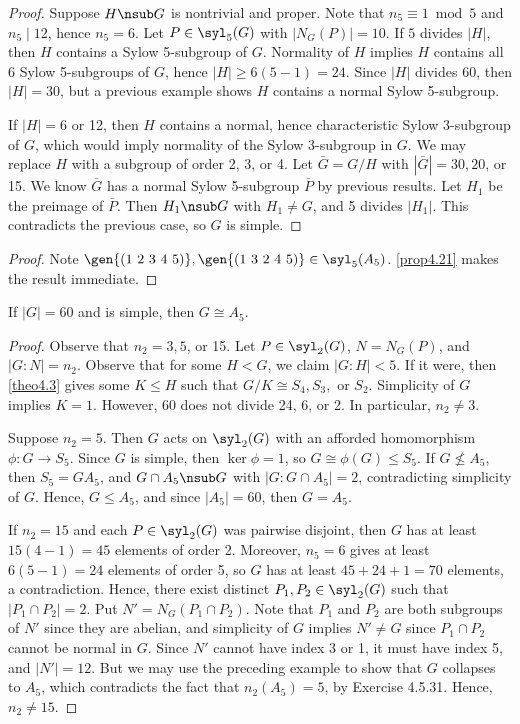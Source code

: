 \begin{proof}
    Suppose $H \nsub G$ is nontrivial and proper. Note that $n_5 \equiv 1 \bmod 5$ and $n_5 \mid 12$, hence $n_5 = 6$. Let $P \in \syl_5(G)$ with $|N_G(P)| = 10$. If $5$ divides $|H|$, then $H$ contains a Sylow 5-subgroup of $G$. Normality of $H$ implies $H$ contains all 6 Sylow 5-subgroups of $G$, hence $|H| \geq 6(5 - 1) = 24$. Since $|H|$ divides $60$, then $|H| = 30$, but a previous example shows $H$ contains a normal Sylow 5-subgroup.

    If $|H| = 6$ or 12, then $H$ contains a normal, hence characteristic Sylow 3-subgroup of $G$, which would imply normality of the Sylow 3-subgroup in $G$. We may replace $H$ with a subgroup of order 2, 3, or 4. Let $\bar G = G/H$ with $|\bar G| = 30, 20$, or 15. We know $\bar G$ has a normal Sylow 5-subgroup $\bar P$ by previous results. Let $H_1$ be the preimage of $\bar P$. Then $H_1 \nsub G$ with $H_1 \neq G$, and 5 divides $|H_1|$. This contradicts the previous case, so $G$ is simple.
\end{proof}

\cor[$A_5$ is Simple] \label{cor4/22}
\begin{proof}
    Note $\gen{(1\ 2\ 3\ 4\ 5)}, \gen{(1\ 3\ 2\ 4\ 5)} \in \syl_5(A_5)$. \autoref{prop4.21} makes the result immediate.
\end{proof}

 \label{prop4.23}
If $|G| = 60$ and is simple, then $G \cong A_5$.

\begin{proof}
    Observe that $n_2 = 3, 5$, or 15. Let $P \in \syl_2(G)$, $N = N_G(P)$, and $|G : N| = n_2$. Observe that for some $H < G$, we claim $|G : H| < 5$. If it were, then \autoref{theo4.3} gives some $K \leq H$ such that $G/K \cong S_4, S_3,$ or $S_2$. Simplicity of $G$ implies $K = 1$. However, 60 does not divide 24, 6, or 2. In particular, $n_2 \neq 3$.

    Suppose $n_2 = 5$. Then $G$ acts on $\syl_2(G)$ with an afforded homomorphism $\phi : G \to S_5$. Since $G$ is simple, then $\ker\phi = 1$, so $G \cong \phi(G) \leq S_5$. If $G \not\leq A_5$, then $S_5 = GA_5$, and $G \cap A_5 \nsub G$ with $|G : G \cap A_5| = 2$, contradicting simplicity of $G$. Hence, $G \leq A_5$, and since $|A_5| = 60$, then $G = A_5$.

    If $n_2 = 15$ and each $P \in \syl_2(G)$ was pairwise disjoint, then $G$ has at least $15(4 - 1) = 45$ elements of order 2. Moreover, $n_5 = 6$ gives at least $6(5 - 1) = 24$ elements of order 5, so $G$ has at least $45 + 24 + 1 = 70$ elements, a contradiction. Hence, there exist distinct $P_1, P_2 \in \syl_2(G)$ such that $|P_1 \cap P_2| = 2$. Put $N' = N_G(P_1 \cap P_2)$. Note that $P_1$ and $P_2$ are both subgroups of $N'$ since they are abelian, and simplicity of $G$ implies $N' \neq G$ since $P_1 \cap P_2$ cannot be normal in $G$. Since $N'$ cannot have index 3 or 1, it must have index 5, and $|N'| = 12$. But we may use the preceding example to show that $G$ collapses to $A_5$, which contradicts the fact that $n_2(A_5) = 5$, by Exercise 4.5.31. Hence, $n_2 \neq 15$.
\end{proof}

